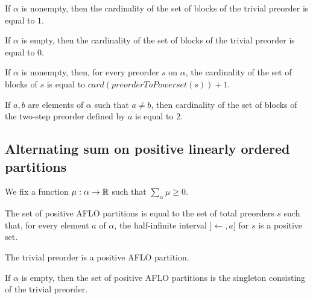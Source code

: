 \begin{sublemma}
If $\alpha$ is nonempty, then the cardinality of the set of blocks of the trivial preorder is equal to $1$.

\end{sublemma}

\begin{sublemma}
If $\alpha$ is empty, then the cardinality of the set of blocks of the trivial preorder is equal to $0$.

\end{sublemma}

\begin{sublemma}
If $\alpha$ is nonempty, then, for every preorder $s$ on $\alpha$, the cardinality of the set of blocks of $s$ is equal to 
$card(preorderToPowerset(s))+1$.

\end{sublemma}

\begin{sublemma}[CardBlocksTwoStepPreorder]
If $a,b$ are elements of $\alpha$ such that $a\ne b$, then cardinality of the set of blocks of the two-step preorder defined by $a$
is equal to $2$.

\end{sublemma}


\subsection{Alternating sum on positive linearly ordered partitions}

We fix a function $\mu:\alpha\to\mathbb{R}$ such that $\sum_{\alpha}\mu\geq 0$.

\begin{sublemma}
The set of positive AFLO partitions is equal to the set of total preorders $s$ such that, for every element $a$ of $\alpha$,
the half-infinite interval $]\leftarrow,a]$ for $s$ is a positive set. 

\end{sublemma}

\begin{sublemma}
The trivial preorder is a positive AFLO partition.

\end{sublemma}

\begin{sublemma}
If $\alpha$ is empty, then the set of positive AFLO partitions is the singleton consisting of the trivial preorder.

\end{sublemma}

